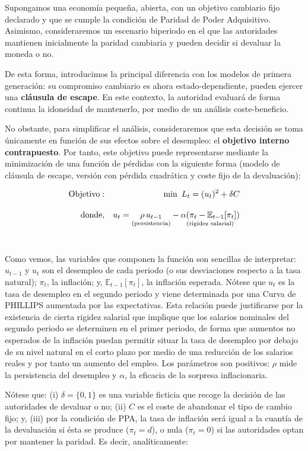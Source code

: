\documentclass[10pt,a4paper]{article}
\begin{document}
Supongamos una economía pequeña, abierta, con un objetivo cambiario fijo declarado y que se cumple la condición de Paridad de Poder Adquisitivo. Asimismo, consideraremos un escenario biperiodo en el que las autoridades mantienen inicialmente la paridad cambiaria y pueden decidir si devaluar la moneda o no.

De esta forma, introducimos la principal diferencia con los modelos de primera generación: su compromiso cambiario es ahora estado-dependiente, pueden ejercer una \textbf{cláusula de escape}. En este contexto, la autoridad evaluará de forma continua la idoneidad de mantenerlo, por medio de un análisis coste-beneficio.

No obstante, para simplificar el análisis, consideraremos que esta decisión se toma únicamente en función de sus efectos sobre el desempleo: el \textbf{objetivo interno contrapuesto}. Por tanto, este objetivo puede representarse mediante la minimización de una función de pérdidas con la siguiente forma (modelo de cláusula de escape, versión con pérdida cuadrática y coste fijo de la devaluación):

$$\begin{aligned}
  \text{Objetivo}:&&\min \,\,L_t=(u_t)^2+\delta C\\[1em]
  \text{donde},&&u_t=\underset{\text{\scriptsize (persistencia)}}{\rho\,u_{t-1}}-\underset{\text{\scriptsize (rigidez salarial)}}{\alpha(\pi_t-\mathbb E_{t-1}[\pi_t])}\\[2em]
\end{aligned}$$

Como vemos, las variables que componen la función son sencillas de interpretar: $u_{t-1}$ y $u_t$ son el desempleo de cada periodo (o sus desviaciones respecto a la tasa natural); $\pi_t$, la inflación; y, $\mathbb E_{t-1}[\pi_t]$, la inflación esperada. Nótese que $u_t$ es la tasa de desempleo en el segundo periodo y viene determinada por una Curva de PHILLIPS aumentada por las expectativas. Esta relación puede justificarse por la existencia de cierta rigidez salarial que implique que los salarios nominales del segundo periodo se determinen en el primer periodo, de forma que aumentos no esperados de la inflación puedan permitir situar la tasa de desempleo por debajo de su nivel natural en el corto plazo por medio de una reducción de los salarios reales y por tanto un aumento del empleo. Los parámetros son positivos: $\rho$ mide la persistencia del desempleo y $\alpha$, la eficacia de la sorpresa inflacionaria.

Nótese que: (i) $\delta=\{0,1\}$ es una variable ficticia que recoge la decisión de las autoridades de devaluar o no; (ii) $C$ es el coste de abandonar el tipo de cambio fijo; y, (iii) por la condición de PPA, la tasa de inflación será igual a la cuantía de la devaluación si ésta se produce ($\pi_t = d$), o nula ($\pi_t=0$) si las autoridades optan por mantener la paridad. Es decir, analíticamente:
\end{document}
